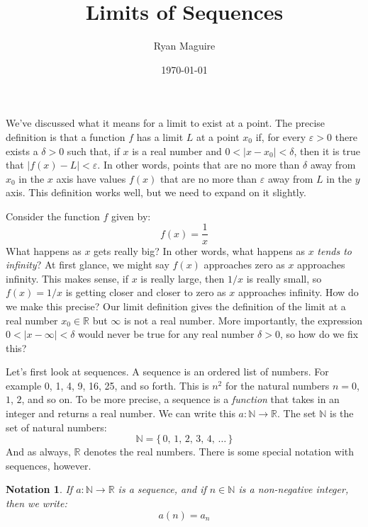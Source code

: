 \documentclass{article}
\title{Limits of Sequences}
\author{Ryan Maguire}
\date{\today}
\theoremstyle{normal}
\newtheorem{notation}{Notation}
\theoremstyle{plain}
\begin{document}
    \maketitle
    We've discussed what it means for a limit to exist at a point. The precise
    definition is that a function $f$ has a limit $L$ at a point $x_{0}$ if,
    for every $\varepsilon>0$ there exists a $\delta>0$ such that, if $x$ is a
    real number and $0<|x-x_{0}|<\delta$, then it is true that
    $|f(x)-L|<\varepsilon$. In other words, points that are no more than
    $\delta$ away from $x_{0}$ in the $x$ axis have values $f(x)$ that are no
    more than $\varepsilon$ away from $L$ in the $y$ axis. This definition
    works well, but we need to expand on it slightly.
    \par\hfill\par
    Consider the function $f$ given by:
    \begin{equation}
        f(x)=\frac{1}{x}
    \end{equation}
    What happens as $x$ gets really big? In other words, what happens as
    $x$ \textit{tends to infinity}? At first glance, we might say $f(x)$
    approaches zero as $x$ approaches infinity. This makes sense, if $x$ is
    really large, then $1/x$ is really small, so $f(x)=1/x$ is getting closer
    and closer to zero as $x$ approaches infinity. How do we make this precise?
    Our limit definition gives the definition of the limit at a real number
    $x_{0}\in\mathbb{R}$ but $\infty$ is not a real number. More importantly,
    the expression $0<|x-\infty|<\delta$ would never be true for any real
    number $\delta>0$, so how do we fix this?
    \par\hfill\par
    Let's first look at sequences. A sequence is an ordered list of numbers.
    For example 0, 1, 4, 9, 16, 25, and so forth. This is $n^{2}$ for the
    natural numbers $n=0$, $1$, $2$, and so on. To be more precise, a sequence
    is a \textit{function} that takes in an integer and returns a real number.
    We can write this $a:\mathbb{N}\rightarrow\mathbb{R}$. The set
    $\mathbb{N}$ is the set of natural numbers:
    \begin{equation}
        \mathbb{N}=\{\,0,\,1,\,2,\,3,\,4,\,\dots\,\}
    \end{equation}
    And as always, $\mathbb{R}$ denotes the real numbers. There is some special
    notation with sequences, however.
    \begin{notation}
        If $a:\mathbb{N}\rightarrow\mathbb{R}$ is a sequence, and if
        $n\in\mathbb{N}$ is a non-negative integer, then we write:
        \begin{equation}
            a(n)=a_{n}
        \end{equation}
    \end{notation}
\end{document}
